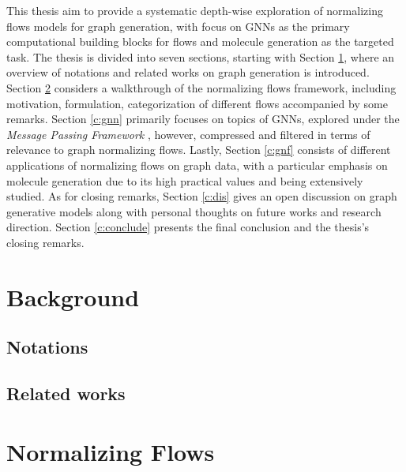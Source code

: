 This thesis aim to provide a systematic depth-wise exploration of normalizing
flows models for graph generation, with focus on GNNs as the primary
computational building blocks for flows and molecule generation as the targeted
task. The thesis is divided into seven sections, starting with Section
\ref{c:bg}, where an overview of notations and related works on graph generation
is introduced. Section \ref{c:nf} considers a walkthrough of the normalizing
flows framework, including motivation, formulation, categorization of different
flows accompanied by some remarks. Section \ref{c:gnn} primarily focuses on
topics of GNNs, explored under the \textit{Message Passing Framework}
\cite{gilmerNeuralMessagePassing2017}, however, compressed and filtered in terms
of relevance to graph normalizing flows. Lastly, Section \ref{c:gnf} consists of
different applications of normalizing flows on graph data, with a particular
emphasis on molecule generation due to its high practical values and
being extensively studied. As for closing remarks, Section
\ref{c:dis} gives an open discussion on graph generative models along with
personal thoughts on future works and research direction. Section
\ref{c:conclude} presents the final conclusion and the thesis's closing remarks.

\chapter{Background}
\label{c:bg}
\section{Notations}
\section{Related works}

\chapter{Normalizing Flows}
\label{c:nf}

